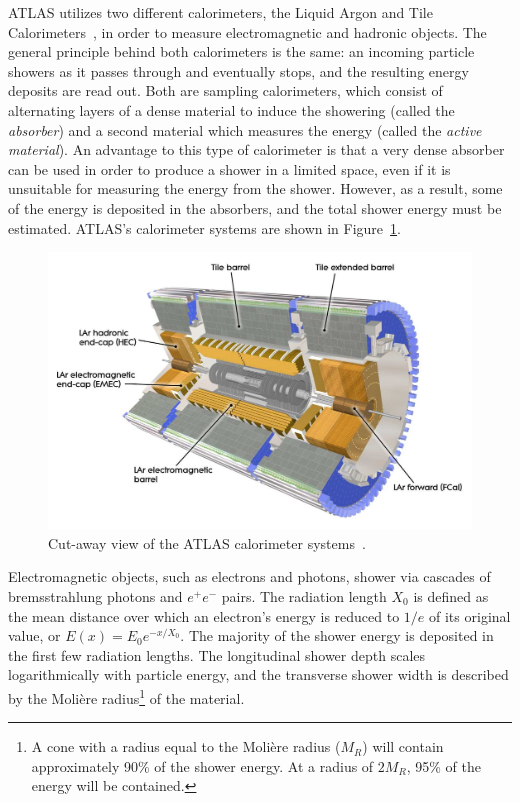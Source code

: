 ﻿ATLAS utilizes two different calorimeters, the Liquid Argon and Tile Calorimeters~\cite{1996.lar-tdr, 1996.tilecal-tdr}, in order to measure electromagnetic and hadronic objects.
The general principle behind both calorimeters is the same: an incoming particle showers as it passes through and eventually stops, and the resulting energy deposits are read out.
Both are sampling calorimeters, which consist of alternating layers of a dense material to induce the showering (called the \emph{absorber}) and a second material which measures the energy (called the \emph{active material}).
An advantage to this type of calorimeter is that a very dense absorber can be used in order to produce a shower in a limited space, even if it is unsuitable for measuring the energy from the shower.
However, as a result, some of the energy is deposited in the absorbers, and the total shower energy must be estimated.
ATLAS's calorimeter systems are shown in Figure~\ref{fig:calorimeters}.

\begin{figure}[htbp]
  \centering
  \includegraphics[width=.8\textwidth]{figs/detector/calorimeter}
  \caption[Cut-away view of the ATLAS calorimeter systems.]{Cut-away view of the ATLAS calorimeter systems~\cite{2018.tilecal}.}
  \label{fig:calorimeters}
\end{figure}

Electromagnetic objects, such as electrons and photons, shower via cascades of bremsstrahlung photons and $e^+ e^-$ pairs.
The radiation length $X_0$ is defined as the mean distance over which an electron's energy is reduced to $1/e$ of its original value, or $E(x) = E_{0}e^{-x/X_0}$.
The majority of the shower energy is deposited in the first few radiation lengths.
The longitudinal shower depth scales logarithmically with particle energy, and the transverse shower width is described by the Moli\`{e}re radius\footnote{A cone with a radius equal to the Moli\`{e}re radius ($M_R$) will contain approximately 90\% of the shower energy.  At a radius of $2M_R$, 95\% of the energy will be contained.} of the material.

